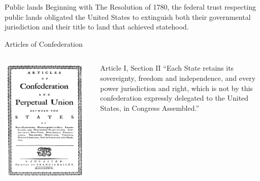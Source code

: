 \begin{frame}
    \begin{alertblock}{Public lands}
        Beginning with The Resolution of 1780, the federal trust respecting public lands obligated the United States to extinguish both their governmental jurisdiction and their title to land that achieved statehood.
    \end{alertblock}
\end{frame}

\begin{frame}{Articles of Confederation}
    \begin{columns}[onlytextwidth]
            \centering
            \includegraphics[width=0.95\textwidth]{img/articles-of-confederation.png} \\

            \begin{block}{Article I, Section II}
                ``Each State retains its sovereignty, freedom and independence, and every power jurisdiction and right, which is not by this confederation expressly delegated to the United States, in Congress Assembled.''
            \end{block}
    \end{columns}
\end{frame}


